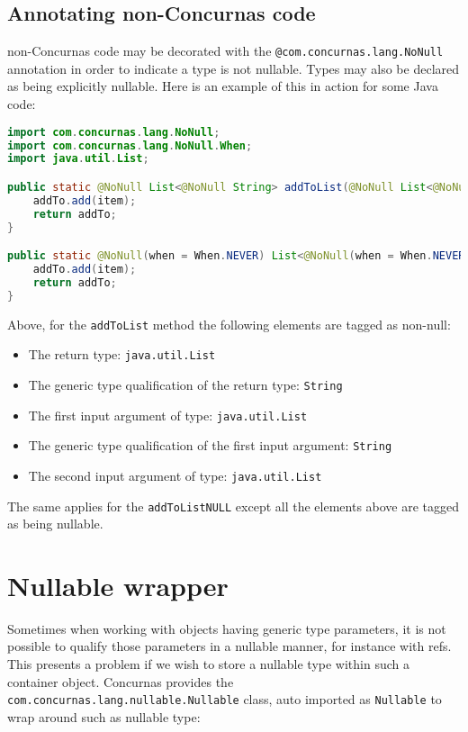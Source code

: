\documentclass[conc-doc]{subfiles}
\begin{document}
\subsection{Annotating non-Concurnas code}
\label{subsubsec:annotatenonconc}
non-Concurnas code may be decorated with the \lstinline{@com.concurnas.lang.NoNull} annotation in order to indicate a type is not nullable. Types may also be declared as being explicitly nullable. Here is an example of this in action for some Java code:

\begin{lstlisting}[language = Java]
import com.concurnas.lang.NoNull;
import com.concurnas.lang.NoNull.When;
import java.util.List;

public static @NoNull List<@NoNull String> addToList(@NoNull List<@NoNull String> addTo, @NoNull String item ){
	addTo.add(item);
	return addTo;
}

public static @NoNull(when = When.NEVER) List<@NoNull(when = When.NEVER) String> addToListNULL(@NoNull(when = When.NEVER) List<@NoNull(when = When.NEVER) String> addTo, @NoNull(when = When.NEVER) String item ){
	addTo.add(item);
	return addTo;
}
\end{lstlisting}

Above, for the \lstinline{addToList} method the following elements are tagged as non-null:
\begin{itemize}
	\item The return type: \lstinline{java.util.List}
	\item The generic type qualification of the return type: \lstinline{String}
	\item The first input argument of type: \lstinline{java.util.List}
	\item The generic type qualification of the first input argument: \lstinline{String}
	\item The second input argument of type: \lstinline{java.util.List}
\end{itemize}

The same applies for the \lstinline{addToListNULL} except all the elements above are tagged as being nullable.


\section{Nullable wrapper}
Sometimes when working with objects having generic type parameters, it is not possible to qualify those parameters in a nullable manner, for instance with refs. This presents a problem if we wish to store a nullable type within such a container object. Concurnas provides the \lstinline{com.concurnas.lang.nullable.Nullable} class, auto imported as \lstinline{Nullable} to wrap around such as nullable type:
\end{document}
